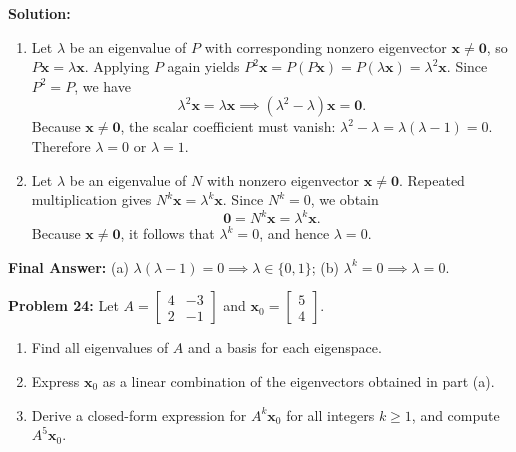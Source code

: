 \documentclass[11pt, letterpaper]{article}
\theoremstyle{definition}
\theoremstyle{remark}
\begin{document}
\textbf{Solution:}
\begin{enumerate}[label=(\alph*)]
    \item Let $\lambda$ be an eigenvalue of $P$ with corresponding nonzero eigenvector $\mathbf{x} \neq \mathbf{0}$, so $P\mathbf{x} = \lambda\mathbf{x}$. Applying $P$ again yields $P^2\mathbf{x} = P(P\mathbf{x}) = P(\lambda\mathbf{x}) = \lambda^2\mathbf{x}$. Since $P^2 = P$, we have
    \[
    \lambda^2\mathbf{x} = \lambda\mathbf{x} \implies (\lambda^2 - \lambda)\mathbf{x} = \mathbf{0}.
    \]
    Because $\mathbf{x} \neq \mathbf{0}$, the scalar coefficient must vanish: $\lambda^2 - \lambda = \lambda(\lambda - 1) = 0$. Therefore $\lambda = 0$ or $\lambda = 1$.

    \item Let $\lambda$ be an eigenvalue of $N$ with nonzero eigenvector $\mathbf{x} \neq \mathbf{0}$. Repeated multiplication gives $N^k\mathbf{x} = \lambda^k\mathbf{x}$. Since $N^k = 0$, we obtain
    \[
    \mathbf{0} = N^k\mathbf{x} = \lambda^k\mathbf{x}.
    \]
    Because $\mathbf{x} \neq \mathbf{0}$, it follows that $\lambda^k = 0$, and hence $\lambda = 0$.
\end{enumerate}
\textbf{Final Answer:} (a) $\lambda(\lambda - 1) = 0 \implies \lambda \in \{0, 1\}$; (b) $\lambda^k = 0 \implies \lambda = 0$.

\vspace{0.4em}
\textbf{Problem 24:}
Let $A = \begin{bmatrix} 4 & -3 \\ 2 & -1 \end{bmatrix}$ and $\mathbf{x}_0 = \begin{bmatrix} 5 \\ 4 \end{bmatrix}$.
\begin{enumerate}[label=(\alph*)]
    \item Find all eigenvalues of $A$ and a basis for each eigenspace.
    \item Express $\mathbf{x}_0$ as a linear combination of the eigenvectors obtained in part (a).
    \item Derive a closed-form expression for $A^k \mathbf{x}_0$ for all integers $k \ge 1$, and compute $A^5 \mathbf{x}_0$.
\end{enumerate}
\end{document}
